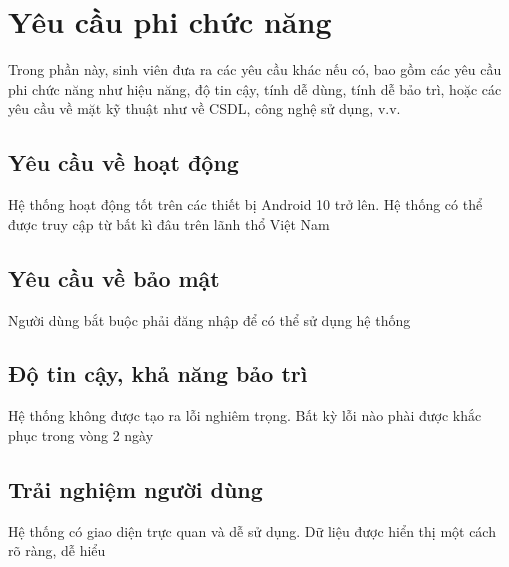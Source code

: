 \documentclass[../DoAn.tex]{subfiles}
\begin{document}
\section{Yêu cầu phi chức năng}
\label{section:2.4}
Trong phần này, sinh viên đưa ra các yêu cầu khác nếu có, bao gồm các yêu cầu phi chức năng như hiệu năng, độ tin cậy, tính dễ dùng, tính dễ bảo trì, hoặc các yêu cầu về mặt kỹ thuật như về CSDL, công nghệ sử dụng, v.v.
\subsection{Yêu cầu về hoạt động}
\label{2.4.1} Hệ thống hoạt động tốt trên các thiết bị Android 10 trở lên.
Hệ thống có thể được truy cập từ bất kì đâu trên lãnh thổ Việt Nam
\subsection{Yêu cầu về bảo mật}
\label{2.4.2} Người dùng bắt buộc phải đăng nhập để có thể sử dụng hệ thống
\subsection{Độ tin cậy, khả năng bảo trì}
\label{2.4.3} Hệ thống không được tạo ra lỗi nghiêm trọng. Bất kỳ lỗi nào phài được khắc phục trong vòng 2 ngày
\subsection{Trải nghiệm người dùng}
\label{2.4.4} Hệ thống có giao diện trực quan và dễ sử dụng. Dữ liệu được hiển thị một cách rõ ràng, dễ hiểu
\end{document}
